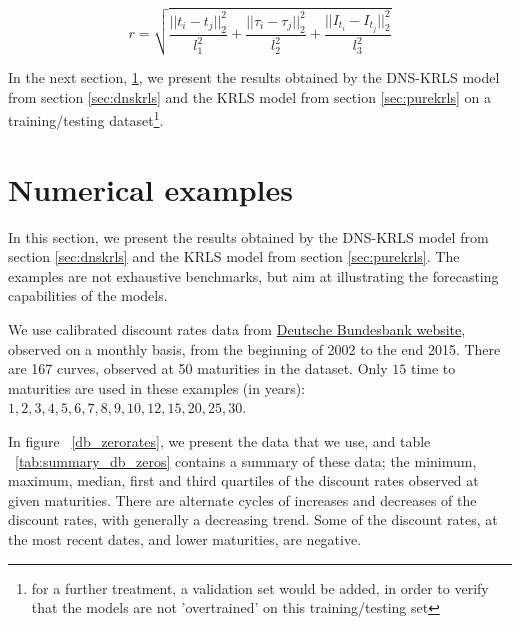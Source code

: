 $$
r = \sqrt{\frac{||t_i - t_j||^2_2}{l_1^2} + \frac{||\tau_i - \tau_j||^2_2}{l_2^2} + \frac{||I_{t_i} - I_{t_j}||^2_2}{l_3^2}}
$$

In the next section, \ref{sec:numericalexamples}, we present the results obtained by the DNS-KRLS model from section \ref{sec:dnskrls} and the KRLS model from section \ref{sec:purekrls} on a training/testing dataset\footnote{for a further treatment, a validation set would be added, in order to verify that the models are not 'overtrained' on this training/testing set}. 


\section{Numerical examples}
\label{sec:numericalexamples}

In this section, we present the results obtained by the DNS-KRLS model from section \ref{sec:dnskrls} and the KRLS model from section \ref{sec:purekrls}. The examples are not exhaustive benchmarks, but aim at illustrating the forecasting capabilities of the models. 

\medskip

We use calibrated discount rates data from \textcolor{blue}{\href{http://www.bundesbank.de/Navigation/EN/Statistics/Time_series_databases/time_series_databases.html}{Deutsche Bundesbank website}}, observed on a monthly basis, from the beginning of 2002 to the end 2015. There are 167 curves, observed at 50 maturities in the dataset. Only $15$ time to maturities are used in these examples (in years): $1, 2, 3, 4, 5, 6, 7, 8, 9, 10, 12, 15, 20, 25, 30$. 

\medskip

In figure ~\ref{db_zerorates}, we present the data that we use, and table ~\ref{tab:summary_db_zeros} contains a summary of these data; the minimum, maximum, median, first and third quartiles of the discount rates observed at given maturities. There are alternate cycles of increases and decreases of the discount rates, with generally a decreasing trend. Some of the discount rates, at the most recent dates, and lower maturities, are negative.


